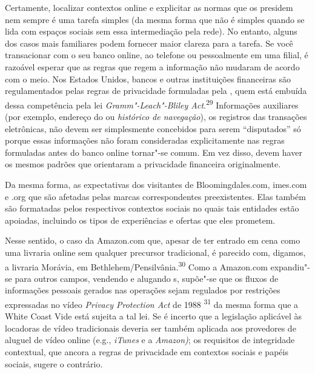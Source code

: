 Certamente, localizar contextos online e explicitar as normas que os
presidem nem sempre é uma tarefa simples (da mesma forma que não é
simples quando se lida com espaços sociais sem essa intermediação pela
rede). No entanto, alguns dos casos mais familiares podem fornecer maior
clareza para a tarefa. Se você transacionar com o seu banco online, ao
telefone ou pessoalmente em uma filial, é razoável esperar que as regras
que regem a informação não mudaram de acordo com o meio. Nos Estados
Unidos, bancos e outras instituições financeiras são regulamentados
pelas regras de privacidade formuladas pela , quem está embuída dessa
competência pela lei \emph{Gramm"-Leach"-Bliley
Act}.\textsuperscript{{29}} Informações auxiliares (por exemplo,
endereço do  ou \emph{histórico de navegação}), os registros das
transações eletrônicas, não devem ser simplesmente concebidos para serem
``disputados'' só porque essas informações não foram consideradas
explicitamente nas regras formuladas antes do banco online tornar"-se
comum. Em vez disso, devem haver os mesmos padrões que orientaram a
privacidade financeira originalmente.

Da mesma forma, as expectativas dos visitantes de Bloomingdales.com,
imes.com e .org que são afetadas pelas marcas correspondentes
preexistentes. Elas também são formatadas pelos respectivos contextos
sociais no quais tais entidades estão apoiadas, incluindo os tipos de
experiências e ofertas que eles prometem.

Nesse sentido, o caso da Amazon.com que, apesar de ter entrado em cena
como uma livraria online sem qualquer precursor tradicional, é parecido
com, digamos, a livraria Morávia, em
Bethlehem/Pensilvânia.\textsuperscript{{30}} Como a Amazon.com
expandiu"-se para outros campos, vendendo e alugando s, supõe"-se que
os fluxos de informações pessoais gerados nas operações sejam regulados
por restrições expressadas no vídeo \emph{Privacy Protection Act} de
1988 \textsuperscript{{31}} da mesma forma que a White Coast Vide está
sujeita a tal lei. Se é incerto que a legislação aplicável às locadoras
de vídeo tradicionais deveria ser também aplicada aos provedores de
aluguel de vídeo online (e.g., \emph{iTunes} e a \emph{Amazon)}; os
requisitos de integridade contextual, que ancora a regras de privacidade
em contextos sociais e papéis sociais, sugere o contrário.

